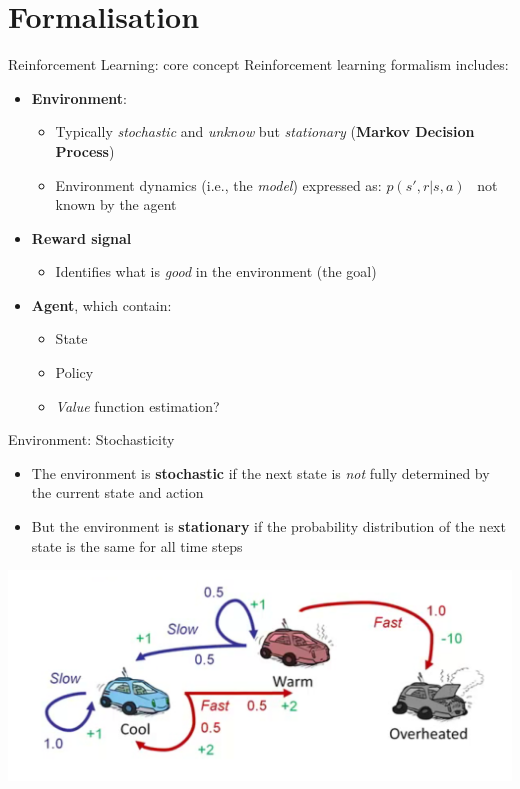 \documentclass[presentation, 9pt]{beamer}\mode<presentation>{\usetheme{AMSBolognaFC}}
\begin{document}
\section{Formalisation}
\begin{frame}{Reinforcement Learning: core concept}
Reinforcement learning formalism includes:
\begin{itemize}
	\item \textbf{Environment}:
	\begin{itemize}
		\item Typically \emph{stochastic} and \emph{unknow} but \emph{stationary} (\textbf{Markov Decision Process})
		\item Environment dynamics (i.e., the \emph{model}) expressed as: $p(s', r | s, a)$ \faArrowRight \, not known by the agent
	\end{itemize}
	\item \textbf{Reward signal} 
	\begin{itemize}
		\item Identifies what is \emph{good} in the environment (the goal)
	\end{itemize}
	\item \textbf{Agent}, which contain:
	\begin{itemize}	
		\item State
		\item Policy
		\item \emph{Value} function estimation?
	\end{itemize}
\end{itemize}
\end{frame}
\begin{frame}{Environment: Stochasticity}
\begin{itemize}
	\item The environment is \textbf{stochastic} if the next state is \emph{not} fully determined by the current state and action
	\item But the environment is \textbf{stationary} if the probability distribution of the next state is the same for all time steps
\end{itemize}
\includegraphics[width=\textwidth]{img/env-dynamics.png}
\end{frame}
\end{document}
